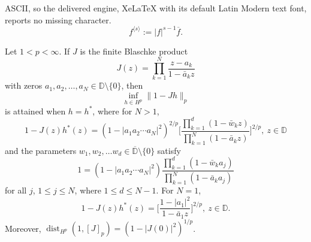 \documentclass[10pt,a4paper]{amsart}
\renewcommand{\leq}{\leqslant}
\begin{document}
ASCII, so the delivered engine, XeLaTeX with its default Latin Modern text font, reports no missing character.
\begin{equation}\label{s-p}
f^{\langle s \rangle} := |f|^{s-1}\overline{f}.
\end{equation}

\begin{Proposition}\label{Npoint}
       Let $1<p<\infty$. If  $J$ is the finite Blaschke product 
       \[
             J(z) = \prod_{k=1}^{N}\frac{ z - a_k }{ 1 - \bar{a}_k z }
       \]
       with zeros $a_1, a_2,\ldots, a_N\in \mathbb{D}\setminus\{0\}$,   then
       \[
            \inf_{h\in H^p}\|1 - Jh\|_p
       \] 
       is attained when $h = h^*$, where  for $ N> 1$,
    \begin{equation}\label{jstarform}
          1 - J(z)h^*(z)  =  (1 - |a_1 a_2 \cdots a_N|^2)^{2/p}  \Bigg[ \frac{\prod_{k=1}^{d}(1 - \bar{w}_k z)}{\prod_{k=1}^{N}(1 - \bar{a}_k z)}\Bigg]^{2/p},\ z \in \mathbb{D}
       \end{equation}
       and the parameters $w_1, w_2,\ldots w_d \in \overline{\mathbb{D}}\setminus \{0\}$ satisfy
       \begin{equation}\label{consconds}
            1 = (1 - |a_1 a_2 \cdots a_N|^2)\frac{\prod_{k=1}^{d}(1 - \bar{w}_k a_j)}{\prod_{k=1}^{N}(1 - \bar{a}_k a_j)}
       \end{equation}
       for all $j$, $1\leq j \leq N$, where $1 \leq d \leq N-1$. 
       For $N = 1$, \begin{equation}\label{jstarform1}
          1 - J(z)h^*(z)  =  \Bigg[ \frac{1 - |a_1|^2}{1 - \bar{a}_1 z}\Bigg]^{2/p},\ z \in \mathbb{D}.
       \end{equation}         
       Moreover, $\operatorname{dist}_{H^p} (1, [J]_p) = \left(1 - |J(0)|^2 \right)^{1/p}$.
       
\end{Proposition}
\end{document}
